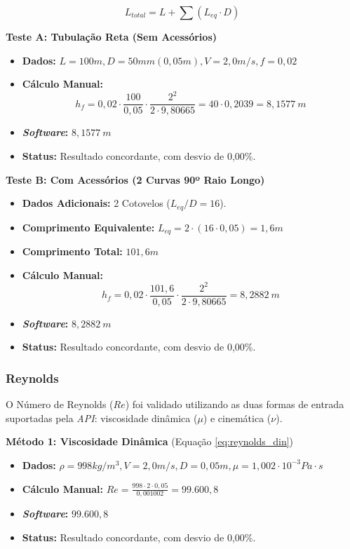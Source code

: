 \begin{equation}
L_{total} = L + \sum (L_{eq} \cdot D)
\label{eq:val_len_total}
\end{equation}

\textbf{Teste A: Tubulação Reta (Sem Acessórios)}
\begin{itemize}
    \item \textbf{Dados:} $L=100m, D=50mm (0,05m), V=2,0m/s, f=0,02$
    \item \textbf{Cálculo Manual:}
    \begin{equation}
h_f = 0,02 \cdot \frac{100}{0,05} \cdot \frac{2^2}{2 \cdot 9,80665} = 40 \cdot 0,2039 = 8,1577 \ m
\label{eq:val_hf_calc_a}
\end{equation}
    \item \textbf{\textit{Software}:} $8,1577 \ m$
    \item \textbf{Status:} Resultado concordante, com desvio de 0,00\%.
\end{itemize}

\textbf{Teste B: Com Acessórios (2 Curvas 90º Raio Longo)}
\begin{itemize}
    \item \textbf{Dados Adicionais:} 2 Cotovelos ($L_{eq}/D = 16$).
    \item \textbf{Comprimento Equivalente:} $L_{eq} = 2 \cdot (16 \cdot 0,05) = 1,6 m$
    \item \textbf{Comprimento Total:} $101,6 m$
    \item \textbf{Cálculo Manual:}
    \begin{equation}
h_f = 0,02 \cdot \frac{101,6}{0,05} \cdot \frac{2^2}{2 \cdot 9,80665} = 8,2882 \ m
\label{eq:val_hf_calc_b}
\end{equation}
    \item \textbf{\textit{Software}:} $8,2882 \ m$
    \item \textbf{Status:} Resultado concordante, com desvio de 0,00\%.
\end{itemize}

\subsubsection{Reynolds}
O Número de Reynolds ($Re$) foi validado utilizando as duas formas de entrada suportadas pela \textit{API}: viscosidade dinâmica ($\mu$) e cinemática ($\nu$).

\textbf{Método 1: Viscosidade Dinâmica}
(Equação \ref{eq:reynolds_din})
\begin{itemize}
    \item \textbf{Dados:} $\rho=998 kg/m^3, V=2,0 m/s, D=0,05 m, \mu=1,002 \cdot 10^{-3} Pa \cdot s$
    \item \textbf{Cálculo Manual:} $Re = \frac{998 \cdot 2 \cdot 0,05}{0,001002} = 99.600,8$
    \item \textbf{\textit{Software}:} $99.600,8$
    \item \textbf{Status:} Resultado concordante, com desvio de 0,00\%.
\end{itemize}

